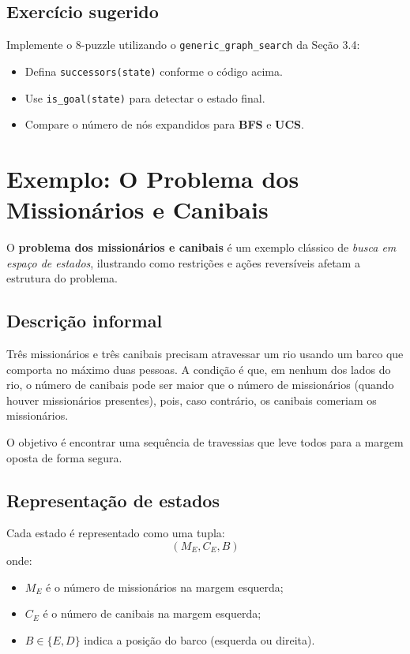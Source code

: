 \documentclass[9pt,a4paper]{extarticle}
\begin{document}
\subsection*{Exercício sugerido}

Implemente o 8-puzzle utilizando o \texttt{generic\_graph\_search} da Seção 3.4:
\begin{itemize}
  \item Defina \texttt{successors(state)} conforme o código acima.
  \item Use \texttt{is\_goal(state)} para detectar o estado final.
  \item Compare o número de nós expandidos para \textbf{BFS} e \textbf{UCS}.
\end{itemize}


\section{Exemplo: O Problema dos Missionários e Canibais}

O \textbf{problema dos missionários e canibais} é um exemplo clássico de \textit{busca em espaço de estados}, ilustrando como restrições e ações reversíveis afetam a estrutura do problema.

\subsection*{Descrição informal}

Três missionários e três canibais precisam atravessar um rio usando um barco que comporta no máximo duas pessoas.  
A condição é que, em nenhum dos lados do rio, o número de canibais pode ser maior que o número de missionários (quando houver missionários presentes), pois, caso contrário, os canibais comeriam os missionários.

O objetivo é encontrar uma sequência de travessias que leve todos para a margem oposta de forma segura.

\subsection*{Representação de estados}

Cada estado é representado como uma tupla:
\[
(M_E, C_E, B)
\]
onde:
\begin{itemize}
  \item $M_E$ é o número de missionários na margem esquerda;
  \item $C_E$ é o número de canibais na margem esquerda;
  \item $B \in \{E, D\}$ indica a posição do barco (esquerda ou direita).
\end{itemize}
\end{document}
